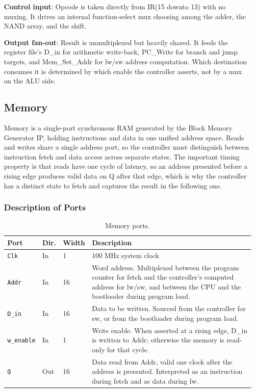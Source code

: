 \documentclass[11pt,letterpaper]{article}
\begin{document}
\textbf{Control input}: Opcode is taken directly from IR(15 downto 13) with no muxing. It drives an internal function-select mux choosing among the adder, the NAND array, and the shift.

\textbf{Output fan-out}: Result is unmultiplexed but heavily shared. It feeds the register file's D\_in for arithmetic write-back, PC\_Write for branch and jump targets, and Mem\_Set\_Addr for lw/sw address computation. Which destination consumes it is determined by which enable the controller asserts, not by a mux on the ALU side.

\subsection{Memory}
Memory is a single-port synchronous RAM generated by the Block Memory Generator IP, holding instructions and data in one unified address space. Reads and writes share a single address port, so the controller must distinguish between instruction fetch and data access across separate states. The important timing property is that reads have one cycle of latency, so an address presented before a rising edge produces valid data on Q after that edge, which is why the controller has a distinct state to fetch and captures the result in the following one.
\subsubsection{Description of Ports}
\begin{table}[H]
  \centering
  \small
  \begin{tabular}{@{}lllp{}@{}}
    \toprule
    \textbf{Port} & \textbf{Dir.} & \textbf{Width} & \textbf{Description} \\
    \midrule
    \texttt{Clk}             & In  & 1  & 100 MHz system clock\\
    \texttt{Addr} & In & 16 & Word address. Multiplexed between the program counter for fetch and the controller's computed address for lw/sw, and between the CPU and the bootloader during program load.\\
    \texttt{D\_in} & In & 16 & Data to be written. Sourced from the controller for sw, or from the bootloader during program load.\\
    \texttt{w\_enable} & In & 1 & Write enable. When asserted at a rising edge, D\_in is written to Addr; otherwise the memory is read-only for that cycle.\\
    \texttt{Q} & Out & 16 & Data read from Addr, valid one clock after the address is presented. Interpreted as an instruction during fetch and as data during lw.\\
    \bottomrule
  \end{tabular}
  \caption{Memory ports.}
\end{table}
\end{document}
